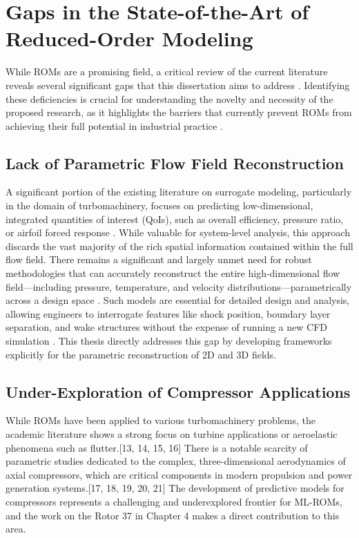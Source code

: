 \documentclass[dsc, EN]{ufabcFHZh}
\begin{document}
{\section{Gaps in the State-of-the-Art of Reduced-Order Modeling}

While ROMs are a promising field, a critical review of the current literature reveals several significant gaps that this dissertation aims to address \citep{Lu2021}. Identifying these deficiencies is crucial for understanding the novelty and necessity of the proposed research, as it highlights the barriers that currently prevent ROMs from achieving their full potential in industrial practice \citep{benner2015survey}.

\subsection{Lack of Parametric Flow Field Reconstruction}

A significant portion of the existing literature on surrogate modeling, particularly in the domain of turbomachinery, focuses on predicting low-dimensional, integrated quantities of interest (QoIs), such as overall efficiency, pressure ratio, or airfoil forced response \citep{brown2009reduced, Kelly2021}. While valuable for system-level analysis, this approach discards the vast majority of the rich spatial information contained within the full flow field. There remains a significant and largely unmet need for robust methodologies that can accurately reconstruct the entire high-dimensional flow field—including pressure, temperature, and velocity distributions—parametrically across a design space \citep{ye2024data}. Such models are essential for detailed design and analysis, allowing engineers to interrogate features like shock position, boundary layer separation, and wake structures without the expense of running a new CFD simulation \citep{crispo2023reduced}. This thesis directly addresses this gap by developing frameworks explicitly for the parametric reconstruction of 2D and 3D fields.

\subsection{Under-Exploration of Compressor Applications}

While ROMs have been applied to various turbomachinery problems, the academic literature shows a strong focus on turbine applications or aeroelastic phenomena such as flutter.[13, 14, 15, 16] There is a notable scarcity of parametric studies dedicated to the complex, three-dimensional aerodynamics of axial compressors, which are critical components in modern propulsion and power generation systems.[17, 18, 19, 20, 21] The development of predictive models for compressors represents a challenging and underexplored frontier for ML-ROMs, and the work on the Rotor 37 in Chapter 4 makes a direct contribution to this area.


}
\end{document}
